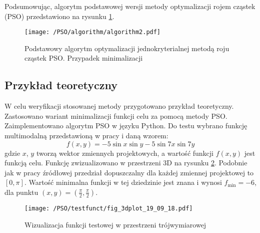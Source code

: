 Podsumowując, algorytm podstawowej wersji metody optymalizacji rojem cząstek (PSO) przedstawiono na rysunku \ref{fig: pso_single_algorith}.
\begin{figure}[h]
	\centering
	\texttt{[image: /PSO/algorithm/algorithm2.pdf]} 
	\captionsetup{justification=centering}
	\caption{Podstawowy algorytm optymalizacji jednokryterialnej metodą roju cząstek PSO. Przypadek minimalizacji}
	\label{fig: pso_single_algorith}
\end{figure}


\subsection{Przykład teoretyczny}
W celu weryfikacji stosowanej metody przygotowano przykład teoretyczny. Zastosowano wariant minimalizacji funkcji celu za pomocą metody PSO. Zaimplementowano algorytm PSO w języku Python. Do testu wybrano funkcję multimodalną przedstawioną w pracy \parencite{Tesch2016} i daną wzorem:
\begin{equation} \label{eq: pso_test_func}
	f(x,y) = -5\sin{x}\sin{y}-5\sin{7x}\sin{7y}
\end{equation}
gdzie $x$, $y$ tworzą wektor zmiennych projektowych, a wartość funkcji $f(x,y)$ jest funkcją celu. Funkcję zwizualizowano w przestrzeni 3D na rysunku \ref{fig: pso_example_function}. Podobnie jak w pracy źródłowej przedział dopuszczalny dla każdej zmiennej projektowej to $[0,\pi]$. Wartość minimalna funkcji w tej dziedzinie jest znana i wynosi $f_{\text{min}}=-6$, dla punktu $(x,y)=(\frac{\pi}{2},\frac{\pi}{2})$.
\begin{figure}[h]
	\centering
	\texttt{[image: /PSO/testfunct/fig\_3dplot\_19\_09\_18.pdf]} 
	\captionsetup{justification=centering}
	\caption{Wizualizacja funkcji testowej w przestrzeni trójwymiarowej}
	\label{fig: pso_example_function}
\end{figure}


